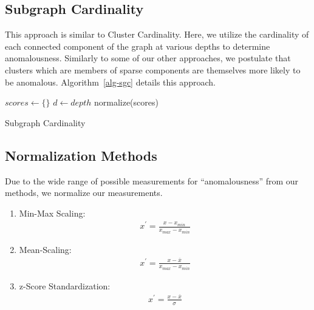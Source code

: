 \subsection{Subgraph Cardinality}

This approach is similar to Cluster Cardinality. Here,  we utilize the cardinality of each connected component of the graph at various depths to determine anomalousness.
Similarly to some of our other approaches, we postulate that clusters which are members of sparse components are themselves more likely to be anomalous. Algorithm~\ref{alg-sgc} details this approach.

\begin{algorithm}
\DontPrintSemicolon
\SetAlgoLined
{}
 $scores \leftarrow \{\}$\;
 $d \leftarrow depth$\;
 normalize(scores)\;
 \caption{Subgraph Cardinality}
 \label{alg-sgc}
\end{algorithm}

\subsection{Normalization Methods}

Due to the wide range of possible measurements for ``anomalousness'' from our methods, we normalize our measurements.

\begin{enumerate}
    \item Min-Max Scaling:
    \begin{gather}
        x^{\prime} = \frac{x - x_{min}}{x_{max} - x_{min}}
        \label{sec:methods:min-max-normalizationn}
    \end{gather}
    
    \item Mean-Scaling:
    \begin{gather}
        x^{\prime} = \frac{x - \overline{x}}{x_{max} - x_{min}}
        \label{sec:methods:mean-scaling}
    \end{gather}
    
    \item z-Score Standardization:
    \begin{gather}
        x^{\prime} = \frac{x - \overline{x}}{\sigma}
        \label{sec:methods:z-score}
    \end{gather}

\end{enumerate}
